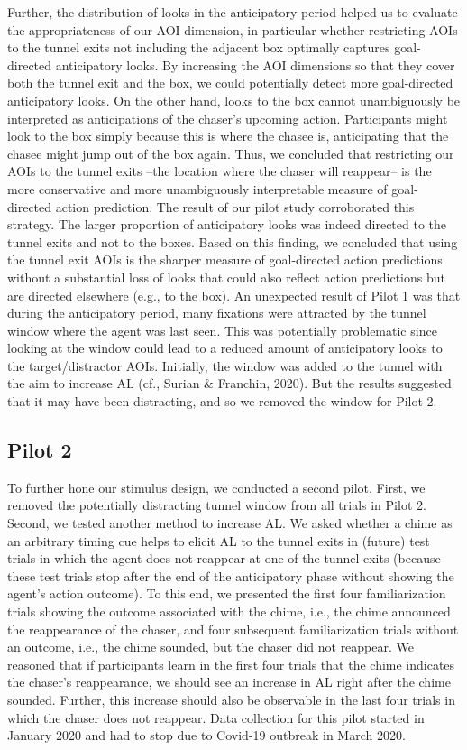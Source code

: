 \documentclass[
  man, donotrepeattitle,floatsintext]{apa6}
\begin{document}
Further, the distribution of looks in the anticipatory period helped us to evaluate the appropriateness of our AOI dimension, in particular whether restricting AOIs to the tunnel exits not including the adjacent box optimally captures goal-directed anticipatory looks. By increasing the AOI dimensions so that they cover both the tunnel exit and the box, we could potentially detect more goal-directed anticipatory looks. On the other hand, looks to the box cannot unambiguously be interpreted as anticipations of the chaser's upcoming action. Participants might look to the box simply because this is where the chasee is, anticipating that the chasee might jump out of the box again. Thus, we concluded that restricting our AOIs to the tunnel exits --the location where the chaser will reappear-- is the more conservative and more unambiguously interpretable measure of goal-directed action prediction. The result of our pilot study corroborated this strategy. The larger proportion of anticipatory looks was indeed directed to the tunnel exits and not to the boxes. Based on this finding, we concluded that using the tunnel exit AOIs is the sharper measure of goal-directed action predictions without a substantial loss of looks that could also reflect action predictions but are directed elsewhere (e.g., to the box).
An unexpected result of Pilot 1 was that during the anticipatory period, many fixations were attracted by the tunnel window where the agent was last seen. This was potentially problematic since looking at the window could lead to a reduced amount of anticipatory looks to the target/distractor AOIs. Initially, the window was added to the tunnel with the aim to increase AL (cf., Surian \& Franchin, 2020). But the results suggested that it may have been distracting, and so we removed the window for Pilot 2.

\subsection{Pilot 2}\label{pilot-2}

To further hone our stimulus design, we conducted a second pilot. First, we removed the potentially distracting tunnel window from all trials in Pilot 2. Second, we tested another method to increase AL. We asked whether a chime as an arbitrary timing cue helps to elicit AL to the tunnel exits in (future) test trials in which the agent does not reappear at one of the tunnel exits (because these test trials stop after the end of the anticipatory phase without showing the agent's action outcome). To this end, we presented the first four familiarization trials showing the outcome associated with the chime, i.e., the chime announced the reappearance of the chaser, and four subsequent familiarization trials without an outcome, i.e., the chime sounded, but the chaser did not reappear. We reasoned that if participants learn in the first four trials that the chime indicates the chaser's reappearance, we should see an increase in AL right after the chime sounded. Further, this increase should also be observable in the last four trials in which the chaser does not reappear. Data collection for this pilot started in January 2020 and had to stop due to Covid-19 outbreak in March 2020.
\end{document}

